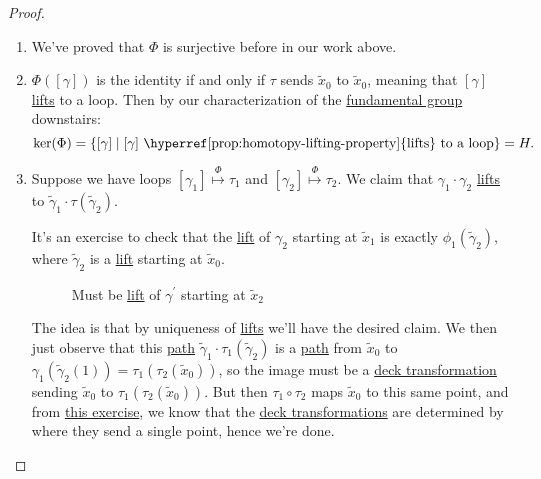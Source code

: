 \begin{proof}
	\begin{enumerate}
		\item We've proved that \(\Phi \) is surjective before in our work above.
		\item \(\Phi ([\gamma ])\) is the identity if and only if \(\tau \) sends \(\widetilde{x} _0\) to \(\widetilde{x} _0\), meaning that \([\gamma ]\)
		      \hyperref[prop:homotopy-lifting-property]{lifts} to a loop. Then by our characterization of the \hyperref[def:fundamental-group]{fundamental group} downstairs:
		      \[
			      \mathrm{ker}(\Phi ) = \left\{[\gamma ] \mid \text{\([\gamma ]\) \hyperref[prop:homotopy-lifting-property]{lifts} to a loop} \right\} = H.
		      \]
		\item Suppose we have loops \([\gamma _1]\overset{\Phi }{\mapsto } \tau _1\) and \([\gamma _2]\overset{\Phi }{\mapsto }\tau _2\). We claim that \(\gamma _1\cdot \gamma _2\)
		      \hyperref[prop:homotopy-lifting-property]{lifts} to \(\widetilde{\gamma} _1\cdot \tau (\widetilde{\gamma} _2)\).
		      \begin{figure}[H]
			      \centering
			      \label{fig:pf:prop:lec17-1}
		      \end{figure}
		      It's an exercise to check that the \hyperref[prop:homotopy-lifting-property]{lift} of \(\gamma _2\) starting at \(\widetilde{x} _1\) is exactly
		      \(\phi _1(\widetilde{\gamma} _2)\), where \(\widetilde{\gamma} _2\) is a \hyperref[prop:homotopy-lifting-property]{lift} starting at \(\widetilde{x} _0\).
		      \begin{figure}[H]
			      \centering
			      \caption{Must be \hyperref[prop:homotopy-lifting-property]{lift} of \(\gamma ^\prime \) starting at \(\widetilde{x} _2\)}
			      \label{fig:pf:prop:lec17-2 }
		      \end{figure}
		      The idea is that by uniqueness of \hyperref[prop:homotopy-lifting-property]{lifts} we'll have the desired claim. We then just observe that
		      this \hyperref[def:path]{path} \(\widetilde{\gamma} _1\cdot \tau _1(\widetilde{\gamma} _2)\) is a \hyperref[def:path]{path} from \(\widetilde{x} _0\)
		      to \(\gamma_1(\widetilde{\gamma} _2(1)) = \tau_1(\tau _2(\widetilde{x} _0))\), so the image must be a \hyperref[def:deck-transformation]{deck transformation}
		      sending \(\widetilde{x} _0\) to \(\tau _1(\tau _2(\widetilde{x} _0))\). But then \(\tau _1\circ \tau _2\) maps \(\widetilde{x} _0\)
		      to this same point, and from \hyperref[ex:lec17]{this exercise}, we know that the \hyperref[def:deck-transformation]{deck transformations} are determined by
		      where they send a single point, hence we're done.
	\end{enumerate}
\end{proof}

